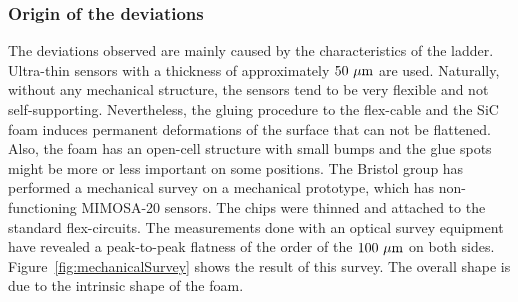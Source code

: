       \subsubsection{Origin of the deviations}

      The deviations observed are mainly caused by the characteristics of the ladder.
      Ultra-thin sensors with a thickness of approximately $50~\rm{\mu m}$ are used.
      Naturally, without any mechanical structure, the sensors tend to be very flexible and not self-supporting.
      Nevertheless, the gluing procedure to the flex-cable and the \gls{SiC} foam induces permanent deformations of the surface that can not be flattened.
      Also, the foam has an open-cell structure with small bumps and the glue spots might be more or less important on some positions.
      The Bristol group has performed a mechanical survey on a mechanical prototype, which has non-functioning MIMOSA-20 sensors.
      The chips were thinned and attached to the standard flex-circuits.
      The measurements done with an optical survey equipment have revealed a peak-to-peak flatness of the order of the $100~\rm{\mu m}$ on both sides.
      Figure~\ref{fig:mechanicalSurvey} shows the result of this survey.
      The overall shape is due to the intrinsic shape of the foam.
       
